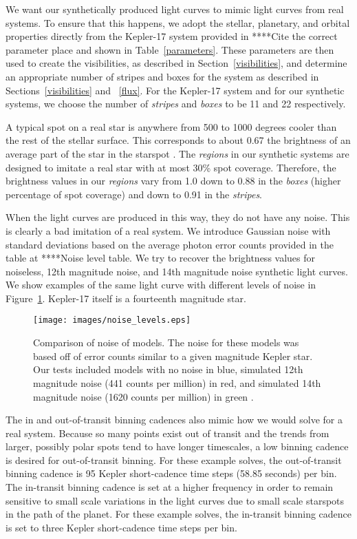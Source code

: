 We want our synthetically produced light curves to mimic light curves from real systems. To ensure that this happens, we adopt the stellar, planetary, and orbital properties directly from the Kepler-17 system provided in \citet{Borucki????} ****Cite the correct parameter place and shown in Table~\ref{parameters}. These parameters are then used to create the visibilities, as described in Section~\ref{visibilities}, and determine an appropriate number of stripes and boxes for the system as described in Sections~\ref{visibilities} and ~\ref{flux}. For the Kepler-17 system and for our synthetic systems, we choose the number of {\it stripes} and {\it boxes} to be 11 and 22 respectively.

A typical spot on a real star is anywhere from 500 to 1000 degrees cooler than the rest of the stellar surface. This corresponds to about 0.67 the brightness of an average part of the star in the starspot \citep{Walkowicz2013}. The {\it regions} in our synthetic systems are designed to imitate a real star with at most 30\% spot coverage. Therefore, the brightness values in our {\it regions} vary from 1.0 down to 0.88 in the {\it boxes} (higher percentage of spot coverage) and down to 0.91 in the {\it stripes}. 

When the light curves are produced in this way, they do not have any noise. This is clearly a bad imitation of a real system. We introduce Gaussian noise with standard deviations based on the average photon error counts provided in the table at \citet{noise_levels_table}****Noise level table. We try to recover the brightness values for noiseless, 12th magnitude noise, and 14th magnitude noise synthetic light curves. We show examples of the same light curve with different levels of noise in Figure~\ref{noise_comp}. Kepler-17 itself is a fourteenth magnitude star.

\begin{figure}
	\centering
	\texttt{[image: images/noise\_levels.eps]}
	\caption{Comparison of noise of models. The noise for these models was based off of error counts similar to a given magnitude Kepler star. Our tests included models with no noise in blue, simulated 12th magnitude noise (441 counts per million) in red, and simulated 14th magnitude noise (1620 counts per million) in green \citep{noiseCounts}.}
	\label{noise_comp}
\end{figure}

The in and out-of-transit binning cadences also mimic how we would solve for a real system. Because so many points exist out of transit and the trends from larger, possibly polar spots tend to have longer timescales, a low binning cadence is desired for out-of-transit binning. For these example solves, the out-of-transit binning cadence is 95 Kepler short-cadence time steps (58.85 seconds) per bin. The in-transit binning cadence is set at a higher frequency in order to remain sensitive to small scale variations in the light curves due to small scale starspots in the path of the planet. For these example solves, the in-transit binning cadence is set to three Kepler short-cadence time steps per bin.

